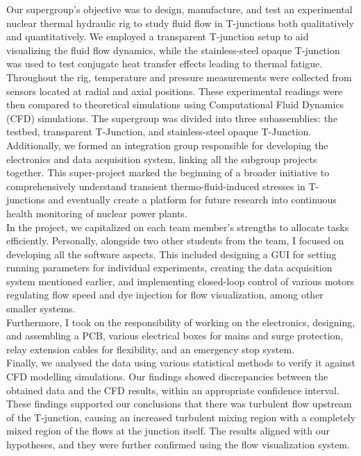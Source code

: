\documentclass[8pt,a5paper]{article}
\begin{document}
Our supergroup's objective was to design, manufacture, and test an experimental nuclear thermal hydraulic rig to study fluid flow in T-junctions both qualitatively and quantitatively. We employed a transparent T-junction setup to aid visualizing the fluid flow dynamics, while the stainless-steel opaque T-junction was used to test conjugate heat transfer effects leading to thermal fatigue. Throughout the rig, temperature and pressure measurements were collected from sensors located at radial and axial positions. These experimental readings were then compared to theoretical simulations using Computational Fluid Dynamics (CFD) simulations. The supergroup was divided into three subassemblies: the testbed, transparent T-Junction, and stainless-steel opaque T-Junction. Additionally, we formed an integration group responsible for developing the electronics and data acquisition system, linking all the subgroup projects together. This super-project marked the beginning of a broader initiative to comprehensively understand transient thermo-fluid-induced stresses in T-junctions and eventually create a platform for future research into continuous health monitoring of nuclear power plants.\\

In the project, we capitalized on each team member's strengths to allocate tasks efficiently. Personally, alongside two other students from the team, I focused on developing all the software aspects. This included designing a GUI for setting running parameters for individual experiments, creating the data acquisition system mentioned earlier, and implementing closed-loop control of various motors regulating flow speed and dye injection for flow visualization, among other smaller systems.\\

Furthermore, I took on the responsibility of working on the electronics, designing, and assembling a PCB, various electrical boxes for mains and surge protection, relay extension cables for flexibility, and an emergency stop system.\\

Finally, we analysed the data using various statistical methods to verify it against CFD modelling simulations. Our findings showed discrepancies between the obtained data and the CFD results, within an appropriate confidence interval. These findings supported our conclusions that there was turbulent flow upstream of the T-junction, causing an increased turbulent mixing region with a completely mixed region of the flows at the junction itself. The results aligned with our hypotheses, and they were further confirmed using the flow visualization system.
\end{document}
